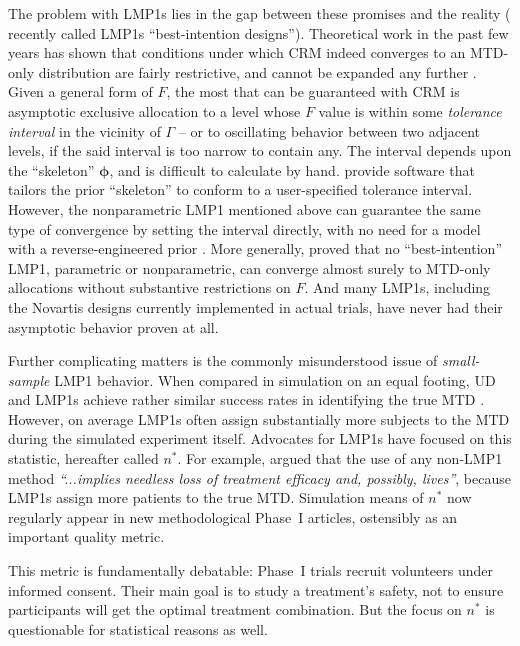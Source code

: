 The problem with LMP1s lies in the gap between these promises and the reality (\cite{Fedo:Flou:Wu:Zhang:Best:2011} recently called LMP1s ``best-intention designs''). Theoretical work in the past few years has shown that conditions under which CRM indeed converges to an MTD-only distribution are fairly restrictive, and cannot be expanded any further \citep{Azri:anot:2012,Lee:Cheu:interv:calibr:2009,oron:azri:hoff:dose:2011}. Given a general form of $F$, the most that can be guaranteed with CRM is asymptotic exclusive allocation to a level whose $F$ value is within some \emph{tolerance interval} in the vicinity of $\Gamma$ -- or to oscillating behavior between two adjacent levels, if the said interval is too narrow to contain any. The interval depends upon the ``skeleton'' $\boldsymbol{\phi}$, and is difficult to calculate by hand. \citep{Lee:Cheu:interv:calibr:2009} provide software that tailors the prior ``skeleton'' to conform to a user-specified tolerance interval. However, the nonparametric LMP1 mentioned above can guarantee the same type of convergence by setting the interval directly, with no need for a model with a reverse-engineered prior  \citep{Ivan:Flou:Chun:Cumu:2007,oron:azri:hoff:dose:2011}. More generally, \cite{Azri:etal:imposs:2011} proved that no ``best-intention'' LMP1, parametric or nonparametric, can converge almost surely to MTD-only allocations without substantive restrictions on $F$. And many LMP1s, including the Novartis designs currently implemented in actual trials, have never had their asymptotic behavior proven at all.

Further complicating matters is the commonly misunderstood issue of \emph{small-sample} LMP1 behavior. When compared in simulation on an equal footing, UD and LMP1s achieve rather similar success rates in identifying the true MTD \citep{Oron:Hoff:smal:2013}. However, on average LMP1s often assign substantially more subjects to the MTD during the simulated experiment itself. Advocates for LMP1s have focused on this statistic, hereafter called $n^*$. For example, \cite{Rogat:etal:oped:2007} argued that the use of any non-LMP1 method \emph{``...implies needless loss of treatment efficacy and, possibly, lives''}, because LMP1s assign more patients to the true MTD. Simulation means of $n^*$ now regularly appear in new methodological Phase~I articles, ostensibly as an important quality metric.

This metric is fundamentally debatable: Phase~I trials recruit volunteers under informed consent. Their main goal is to study a treatment's safety, not to ensure participants will get the optimal treatment combination. But the focus on $n^*$ is questionable for statistical reasons as well.

